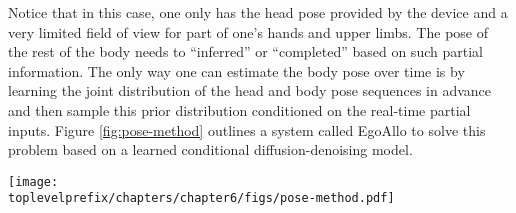 \documentclass[../../book-main.tex]{subfiles}
\begin{document}
Notice that in this case, one only has the head pose  provided by the device and a very limited field of view for part of one's hands and upper limbs. The pose of the rest of the body needs to ``inferred'' or ``completed'' based on such partial information. The only way one can estimate the body pose over time is by learning the joint distribution of the head and body pose sequences in advance and then sample this prior distribution conditioned on the real-time partial inputs. Figure \ref{fig:pose-method} outlines a system called EgoAllo \cite{yi2024egoallo} to solve this problem based on a learned conditional diffusion-denoising model. 
\begin{figure*}[t]
  \centering
  \texttt{[image: \\toplevelprefix/chapters/chapter6/figs/pose-method.pdf]}
\caption{
    \textbf{Overview of technical components of EgoAllo \cite{yi2024egoallo}.}
    A diffusion model is pretrained that can generate body pose sequence based on local body parameters (middle).
    An invariant parameterization $g(\cdot)$ of SLAM poses (left) is used to condition the diffusion model. These can be placed into the global coordinate frame via global alignment to input poses.
    When available, egocentric video is used for hand detection (left) via HaMeR~\cite{pavlakos2023reconstructing}, which can be incorporated into samples via guidance by the generated gesture.
  }
  \label{fig:pose-method}
\end{figure*}
\end{document}
